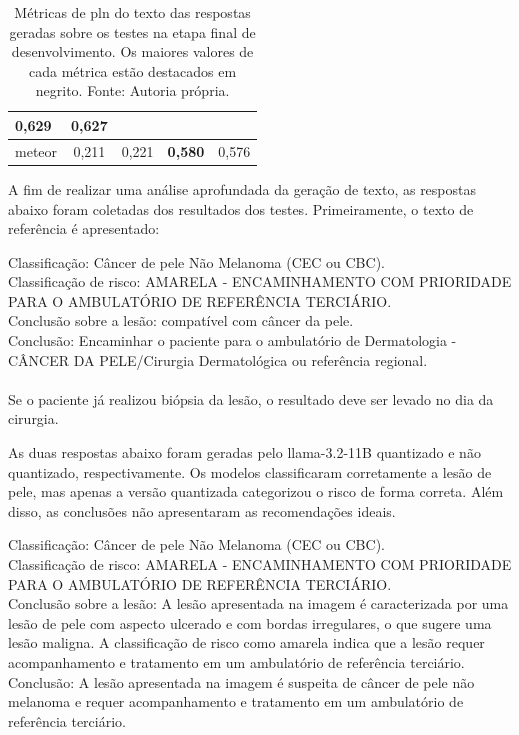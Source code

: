 \begin{table}[ht]
\begin{tabular}{l|c|c|c|c}
        \textbf{0,629}
                                       & 0,627
        \\
        \hline
        \ac{meteor}                    & 0,211                                              & 0,221      &
        \textbf{0,580}
                                       & 0,576
        \\
        \hline
    \end{tabular}
    \label{tab:overall_nlp_metrics}
    \caption{Métricas de \ac{pln} do texto das respostas geradas sobre os testes na etapa final de
    desenvolvimento. Os maiores valores de cada métrica estão destacados em negrito. Fonte: Autoria própria.}
\end{table}

A fim de realizar uma análise aprofundada da geração de texto, as respostas abaixo foram coletadas dos resultados dos
testes. Primeiramente, o texto de referência é apresentado:

\begin{dialogue}
     Classificação: Câncer de pele Não Melanoma (CEC ou CBC). \\
    Classificação de risco: AMARELA - ENCAMINHAMENTO COM PRIORIDADE PARA O AMBULATÓRIO DE REFERÊNCIA TERCIÁRIO. \\
    Conclusão sobre a lesão: compatível com câncer da pele. \\
    Conclusão: Encaminhar o paciente para o ambulatório de Dermatologia - CÂNCER DA PELE/Cirurgia Dermatológica ou
    referência regional. \\ \\
    Se o paciente já realizou biópsia da lesão, o resultado deve ser levado no dia da cirurgia.
\end{dialogue}

As duas respostas abaixo foram geradas pelo \ac{llama}-3.2-11B quantizado e não quantizado, respectivamente. Os modelos
classificaram corretamente a lesão de pele, mas apenas a versão quantizada categorizou o risco de forma correta. Além
disso, as conclusões não apresentaram as recomendações ideais.

\begin{dialogue}
     Classificação: Câncer de pele Não Melanoma (CEC ou CBC). \\
    Classificação de risco: AMARELA - ENCAMINHAMENTO COM PRIORIDADE PARA O AMBULATÓRIO DE REFERÊNCIA TERCIÁRIO. \\
    Conclusão sobre a lesão: A lesão apresentada na imagem é caracterizada por uma lesão de pele com aspecto ulcerado e
    com bordas irregulares, o que sugere uma lesão maligna. A classificação de risco como amarela indica que a lesão
    requer
    acompanhamento e tratamento em um ambulatório de referência terciário. \\
    Conclusão: A lesão apresentada na imagem é suspeita de câncer de pele não melanoma e requer acompanhamento e
    tratamento em um ambulatório de referência terciário.
\end{dialogue}


